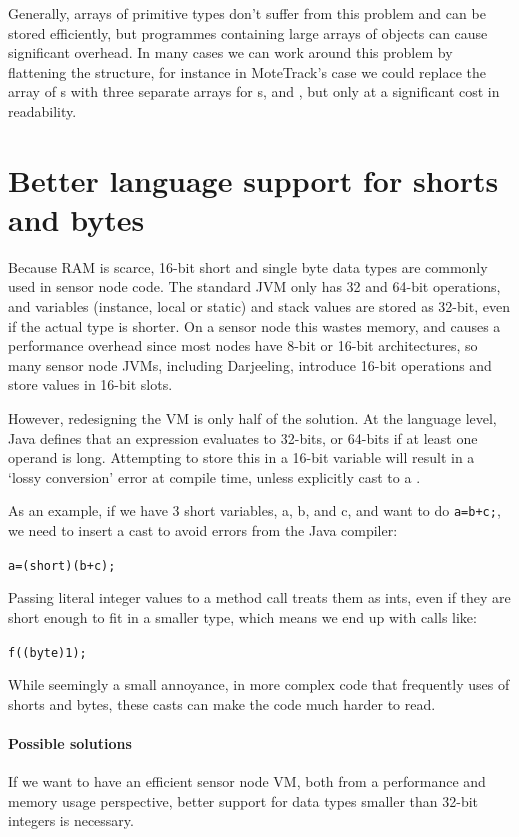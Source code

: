 Generally, arrays of primitive types don't suffer from this problem and can be stored efficiently, but programmes containing large arrays of objects can cause significant overhead. In many cases we can work around this problem by flattening the structure, for instance in MoteTrack's case we could replace the array of s with three separate arrays for s,  and , but only at a significant cost in readability.




\section{Better language support for shorts and bytes}
\label{sec-small-datatypes}
Because RAM is scarce, 16-bit short and single byte data types are commonly used in sensor node code. The standard JVM only has 32 and 64-bit operations, and variables (instance, local or static) and stack values are stored as 32-bit, even if the actual type is shorter. On a sensor node this wastes memory, and causes a performance overhead since most nodes have 8-bit or 16-bit architectures, so many sensor node JVMs, including Darjeeling, introduce 16-bit operations and store values in 16-bit slots.

However, redesigning the VM is only half of the solution. At the language level, Java defines that an expression evaluates to 32-bits, or 64-bits if at least one operand is long. Attempting to store this in a 16-bit variable will result in a `lossy conversion' error at compile time, unless explicitly cast to a .

As an example, if we have 3 short variables, a, b, and c, and want to do 
\texttt{a=b+c;}, we need to insert a cast to avoid errors from the Java compiler:

\texttt{a=(short)(b+c);}

Passing literal integer values to a method call treats them as ints, even if they are short enough to fit in a smaller type, which means we end up with calls like: 

\texttt{f((byte)1);}

While seemingly a small annoyance, in more complex code that frequently uses of shorts and bytes, these casts can make the code much harder to read.

\paragraph{Possible solutions}
If we want to have an efficient sensor node VM, both from a performance and memory usage perspective, better support for data types smaller than 32-bit integers is necessary.

